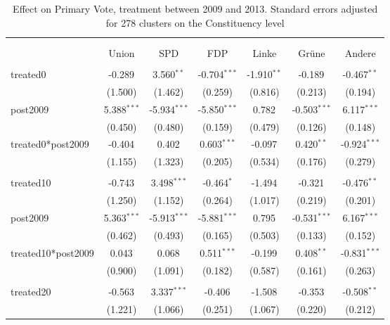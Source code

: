 \documentclass[12pt]{article}
\begin{document}
 
\begin{table}[!htbp] \centering
  \caption{Effect on Primary Vote, treatment between 2009 and 2013. Standard errors adjusted for 278 clusters on the Constituency level}
\begin{tabular}{@{\extracolsep{5pt}}lcccccc}
\\[-1.8ex]\hline
\hline \\[-1.8ex]
\\[-1.8ex] & \multicolumn{1}{c}{Union} & \multicolumn{1}{c}{SPD} & \multicolumn{1}{c}{FDP} & \multicolumn{1}{c}{Linke} & \multicolumn{1}{c}{Grüne} & \multicolumn{1}{c}{Andere}  \\
\hline \\[-1.8ex]
 treated0 & -0.289$^{}$ & 3.560$^{**}$ & -0.704$^{***}$ & -1.910$^{**}$ & -0.189$^{}$ & -0.467$^{**}$ \\
  & (1.500) & (1.462) & (0.259) & (0.816) & (0.213) & (0.194) \\
 post2009 & 5.388$^{***}$ & -5.934$^{***}$ & -5.850$^{***}$ & 0.782$^{}$ & -0.503$^{***}$ & 6.117$^{***}$ \\
  & (0.450) & (0.480) & (0.159) & (0.479) & (0.126) & (0.148) \\
 treated0*post2009 & -0.404$^{}$ & 0.402$^{}$ & 0.603$^{***}$ & -0.097$^{}$ & 0.420$^{**}$ & -0.924$^{***}$ \\
  & (1.155) & (1.323) & (0.205) & (0.534) & (0.176) & (0.279) \\
\hline \\[-1.8ex]
 treated10 & -0.743$^{}$ & 3.498$^{***}$ & -0.464$^{*}$ & -1.494$^{}$ & -0.321$^{}$ & -0.476$^{**}$ \\
  & (1.250) & (1.152) & (0.264) & (1.017) & (0.219) & (0.201) \\
 post2009 & 5.363$^{***}$ & -5.913$^{***}$ & -5.881$^{***}$ & 0.795$^{}$ & -0.531$^{***}$ & 6.167$^{***}$ \\
  & (0.462) & (0.493) & (0.165) & (0.503) & (0.133) & (0.152) \\
 treated10*post2009 & 0.043$^{}$ & 0.068$^{}$ & 0.511$^{***}$ & -0.199$^{}$ & 0.408$^{**}$ & -0.831$^{***}$ \\
  & (0.900) & (1.091) & (0.182) & (0.587) & (0.161) & (0.263) \\
\hline \\[-1.8ex]
 treated20 & -0.563$^{}$ & 3.337$^{***}$ & -0.406$^{}$ & -1.508$^{}$ & -0.353$^{}$ & -0.508$^{**}$ \\
  & (1.221) & (1.066) & (0.251) & (1.067) & (0.220) & (0.212) \\

\end{tabular}
\end{table}
\end{document}
